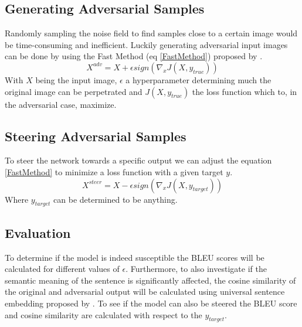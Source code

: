 \subsection*{Generating Adversarial Samples}
Randomly sampling the noise field to find samples close to a certain image would be time-consuming and inefficient. Luckily generating adversarial input images can be done by using the Fast Method (eq \ref{FastMethod}) proposed by \citeauthor{goodfellow2015explaining}.
\begin{equation}
    X^{adv} = X + \epsilon sign(\nabla_{x}J(X, y_{true}))
    \label{FastMethod}
\end{equation}
With $X$ being the input image, $\epsilon$ a hyperparameter determining much the original image can be perpetrated and $J(X, y_{true})$ the loss function which to, in the adversarial case, maximize.

\subsection*{Steering Adversarial Samples}
To steer the network towards a specific output we can adjust the equation \ref{FastMethod} to minimize a loss function with a given target $y$.
\begin{equation}
    X^{steer} = X - \epsilon sign(\nabla_{x}J(X, y_{target}))
\end{equation}
Where $y_{target}$ can be determined to be anything.

\subsection*{Evaluation}
To determine if the model is indeed susceptible the BLEU scores will be calculated for different values of $\epsilon$. Furthermore, to also investigate if the semantic meaning of the sentence is significantly affected, the cosine similarity of the original and adversarial output will be calculated using universal sentence embedding proposed by \citeauthor{DBLP:journals/corr/abs-1803-11175}.
To see if the model can also be steered the BLEU score and cosine similarity are calculated with respect to the $y_{target}$.
